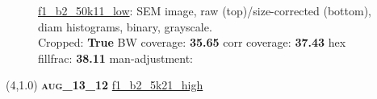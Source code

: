 \begin{figure}[h!]
\label{semimg17}
\caption*{\hyperlink{covtableaug_13_12}{\color{blue} \small \ttfamily f1\_b2\_50k11\_low}: SEM image, raw (top)/size-corrected (bottom), diam histograms, binary, grayscale.\\Cropped: {\bf True} \;\; BW coverage: {\bf 35.65} \:\: corr coverage: {\bf 37.43} \:\: hex fillfrac: {\bf 38.11} \:\: man-adjustment: {\bf \color{blue}{Yes}}}
\end{figure}
\newpage

\begin{textblock}{5}(4,1.0)
{\bf \textsc{aug\_13\_12}}
\hspace{4.5cm}
\hyperlink{covtableaug_13_12}{\color{blue} \large \ttfamily f1\_b2\_5k21\_high}
\end{textblock}

